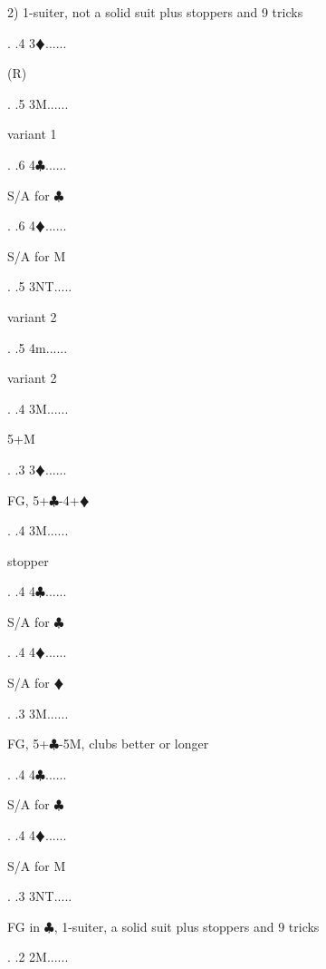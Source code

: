 \documentclass[a4paper]{article}
\newcommand{\BC}{\textcolor{OliveGreen}{$\clubsuit$}}
\newcommand{\BD}{\textcolor{RedOrange}{$\vardiamondsuit$}}
\begin{document}
{\begin{minipage}[t]{0.8\textwidth}
2) 1-suiter, not a solid suit plus stoppers and 9 tricks
\end{minipage}. 
 .4 3\BD......\begin{minipage}[t]{0.8\textwidth}
(R)
\end{minipage}. 
 .5 3M......\begin{minipage}[t]{0.8\textwidth}
variant 1
\end{minipage}. 
 .6 4\BC......\begin{minipage}[t]{0.8\textwidth}
S/A for \BC 
\end{minipage}. 
 .6 4\BD......\begin{minipage}[t]{0.8\textwidth}
S/A for M
\end{minipage}. 
 .5 3NT.....\begin{minipage}[t]{0.8\textwidth}
variant 2
\end{minipage}. 
 .5 4m......\begin{minipage}[t]{0.8\textwidth}
variant 2
\end{minipage}. 
 .4 3M......\begin{minipage}[t]{0.8\textwidth}
5+M
\end{minipage}. 
 .3 3\BD......\begin{minipage}[t]{0.8\textwidth}
FG, 5+\BC -4+\BD 
\end{minipage}. 
 .4 3M......\begin{minipage}[t]{0.8\textwidth}
stopper
\end{minipage}. 
 .4 4\BC......\begin{minipage}[t]{0.8\textwidth}
S/A for \BC 
\end{minipage}. 
 .4 4\BD......\begin{minipage}[t]{0.8\textwidth}
S/A for \BD 
\end{minipage}. 
 .3 3M......\begin{minipage}[t]{0.8\textwidth}
FG, 5+\BC -5M, clubs better or longer
\end{minipage}. 
 .4 4\BC......\begin{minipage}[t]{0.8\textwidth}
S/A for \BC 
\end{minipage}. 
 .4 4\BD......\begin{minipage}[t]{0.8\textwidth}
S/A for M
\end{minipage}. 
 .3 3NT.....\begin{minipage}[t]{0.8\textwidth}
FG in \BC , 1-suiter, a solid suit plus stoppers and 9 tricks
\end{minipage}. 
 .2 2M......\begin{minipage}[t]{0.8\textwidth}

\end{minipage}}
\end{document}
